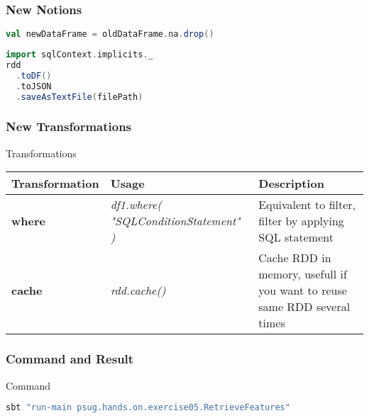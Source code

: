 \documentclass[slidetop,9pt,utf8]{beamer}
\begin{document}
\begin{CJK}{UTF8}{gbsn}
\begin{frame}[fragile]
\end{frame}

\begin{frame}[fragile]
  \frametitle{New Notions}

  \begin{lstlisting}[label=DropNullValue, caption=Drop rows containing null values, language=scala, style=code]
val newDataFrame = oldDataFrame.na.drop()
  \end{lstlisting}

  \begin{lstlisting}[label=SaveJsonFile, caption=Save RDD to JSON File, language=scala, style=code]
import sqlContext.implicits._
rdd
  .toDF()
  .toJSON
  .saveAsTextFile(filePath)
  \end{lstlisting}

\end{frame}

\begin{frame}

  \frametitle{New Transformations}

  \begin{block}{Transformations}
    \begin{center}
      \begin{tabular}{|m{2.1cm}|m{3.5cm}|m{5cm}|}
        \hline 
        \rowcolor{gray} \textbf{Transformation} & \textbf{Usage} & \textbf{Description} \\ \hline
        \textbf{where} & \textit{df1.where( \newline  "SQLConditionStatement" \newline )} & Equivalent to filter, filter by applying SQL statement \\ \hline
        \textbf{cache} & \textit{rdd.cache()} & Cache RDD in memory, usefull if you want to reuse same RDD several times \\ \hline
      \end{tabular}
    \end{center}
  \end{block}

\end{frame}

\begin{frame}[fragile]
  \frametitle{Command and Result}

  \begin{block}{Command}
    \begin{lstlisting}[language=bash, style=terminal]
sbt "run-main psug.hands.on.exercise05.RetrieveFeatures"
    \end{lstlisting}
  \end{block}


\end{frame}
\end{CJK}
\end{document}
